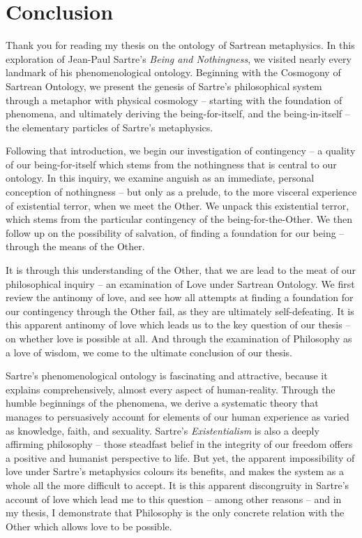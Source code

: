 \chapter{Conclusion}

Thank you for reading my thesis on the ontology of Sartrean metaphysics. In this exploration of Jean-Paul Sartre's \emph{Being and Nothingness}, we visited nearly every landmark of his phenomenological ontology. Beginning with the Cosmogony of Sartrean Ontology, we present the genesis of Sartre's philosophical system through a metaphor with physical cosmology -- starting with the foundation of phenomena, and ultimately deriving the being-for-itself, and the being-in-itself -- the elementary particles of Sartre's metaphysics.

Following that introduction, we begin our investigation of contingency -- a quality of our being-for-itself which stems from the nothingness that is central to our ontology. In this inquiry, we examine anguish as an immediate, personal conception of nothingness -- but only as a prelude, to the more visceral experience of existential terror, when we meet the Other. We unpack this existential terror, which stems from the particular contingency of the being-for-the-Other. We then follow up on the possibility of salvation, of finding a foundation for our being -- through the means of the Other.

It is through this understanding of the Other, that we are lead to the meat of our philosophical inquiry -- an examination of Love under Sartrean Ontology. We first review the antinomy of love, and see how all attempts at finding a foundation for our contingency through the Other fail, as they are ultimately self-defeating. It is this apparent antinomy of love which leads us to the key question of our thesis -- on whether love is possible at all. And through the examination of Philosophy as a love of wisdom, we come to the ultimate conclusion of our thesis.

Sartre's phenomenological ontology is fascinating and attractive, because it explains comprehensively, almost every aspect of human-reality. Through the humble beginnings of the phenomena, we derive a systematic theory that manages to persuasively account for elements of our human experience as varied as knowledge, faith, and sexuality. Sartre's \emph{Existentialism} is also a deeply affirming philosophy -- those steadfast belief in the integrity of our freedom offers a positive and humanist perspective to life. But yet, the apparent impossibility of love under Sartre's metaphysics colours its benefits, and makes the system as a whole all the more difficult to accept. It is this apparent discongruity in Sartre's account of love which lead me to this question -- among other reasons -- and in my thesis, I demonstrate that Philosophy is the only concrete relation with the Other which allows love to be possible.

